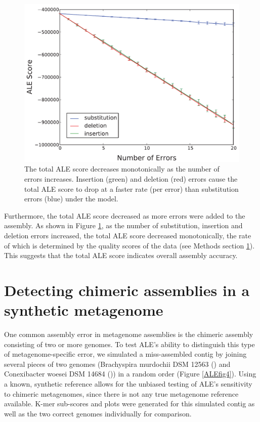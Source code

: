 \documentclass[phd,tocprelim]{cornell}
\begin{document}
\begin{figure}[!tpb]%
    \centerline{\includegraphics[width=\textwidth]{figures/ALE/Clark_Fig3b.pdf}}
    \caption[ALE score vs. number of errors]{The total ALE score decreases monotonically as the number of errors increases. Insertion (green) and deletion (red) errors cause the total ALE score to drop at a faster rate (per error) than substitution errors (blue) under the model.}\label{ALEfig3}
\end{figure}

Furthermore, the total ALE score decreased as more errors were added to the assembly. As shown in Figure \ref{ALEfig3}, as the number of substitution, insertion and deletion errors increased, the total ALE score decreased monotonically, the rate of which is determined by the quality scores of the data (see Methods section \ref{}). This suggests that the total ALE score indicates overall assembly accuracy.

\section{Detecting chimeric assemblies in a synthetic metagenome}
One common assembly error in metagenome assemblies is the chimeric assembly consisting of two or more genomes. To test ALE's ability to distinguish this type of metagenome-specific error, we simulated a miss-assembled contig by joining several pieces of two genomes (Brachyspira murdochii DSM 12563 (\cite{Pati2010}) and Conexibacter woesei DSM 14684 (\cite{Pukall2010})) in a random order (Figure \ref{ALEfig4}).  Using a known, synthetic reference allows for the unbiased testing of ALE's sensitivity to chimeric metagenomes, since there is not any true metagenome reference available. K-mer sub-scores and plots were generated for this simulated contig as well as the two correct genomes individually for comparison.
\end{document}
